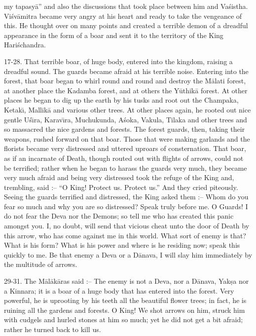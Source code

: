 my tapasy\=a'' and also the discussions that took place between him and Va\'sistha. Vi\'sv\=amitra became very angry at his heart and ready to take the vengeance of this. He thought over on many points and created a terrible demon of a dreadful appearance in the form of a boar and sent it to the territory of the King Hari\'schandra.

17-28. That terrible boar, of huge body, entered into the kingdom, raising a dreadful sound. The guards became afraid at his terrible noise. Entering into the forest, that boar began to whirl round and round and destroy the M\=alati forest, at another place the Kadamba forest, and at others the Y\=uthik\=a forest. At other places he began to dig up the earth by his tusks and root out the Champaka, Ketak\={\i}, Mallik\=a and various other trees. At other places again, he rooted out nice gentle U\'s\={\i}ra, Karav\={\i}ra, Muchukunda, A\'soka, Vakula, Tilaka and other trees and so massacred the nice gardens and forests. The forest guards, then, taking their weapons, rushed forward on that boar. Those that were making garlands and the florists became very distressed and uttered uproars of consternation. That boar, as if an incarnate of Death, though routed out with flights of arrows, could not be terrified; rather when he began to harass the guards very much, they became very much afraid and being very distressed took the refuge of the King and, trembling, said :-- ``O King! Protect us. Protect us.'' And they cried piteously. Seeing the guards terrified and distressed, the King asked them :-- Whom do you fear so much and why you are so distressed? Speak truly before me. O Guards! I do not fear the Deva nor the Demons; so tell me who has created this panic amongst you. I, no doubt, will send that vicious cheat unto the door of Death by this arrow, who has come against me in this world. What sort of enemy is that? What is his form? What is his power and where is he residing now; speak this quickly to me. Be that enemy a Deva or a D\=anava, I will slay him immediately by the multitude of arrows.

29-31. The M\=al\=ak\=aras said :-- The enemy is not a Deva, nor a D\=anava, Yak\d{s}a nor a Kinnara; it is a boar of a huge body that has entered into the forest. Very powerful, he is uprooting by his teeth all the beautiful flower trees; in fact, he is ruining all the gardens and forests. O King! We shot arrows on him, struck him with cudgels and hurled stones at him so much; yet he did not get a bit afraid; rather he turned back to kill us.

